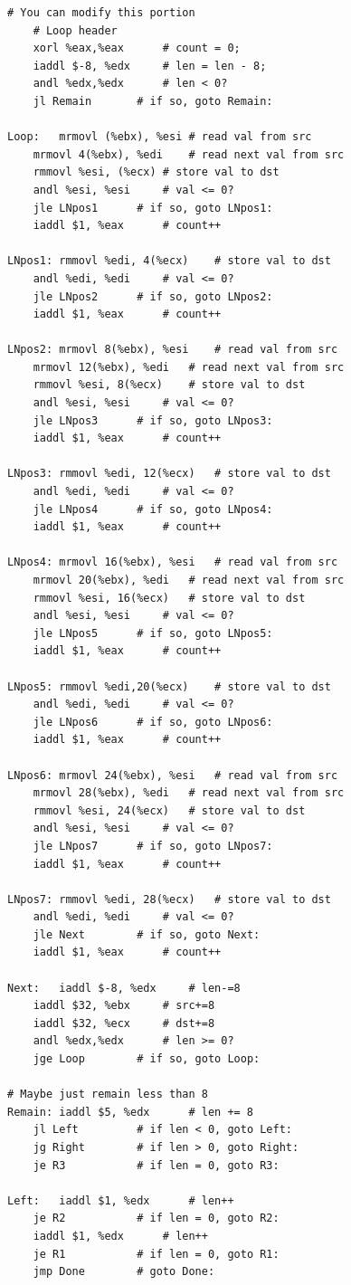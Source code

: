 \documentclass{article}
\begin{document}
\begin{lstlisting}[caption={Core Code of ncopy.ys}, label={cd:ncopy}]
# You can modify this portion
	# Loop header
	xorl %eax,%eax		# count = 0;
	iaddl $-8, %edx		# len = len - 8;
	andl %edx,%edx		# len < 0?
	jl Remain		# if so, goto Remain:

Loop:	mrmovl (%ebx), %esi	# read val from src
	mrmovl 4(%ebx), %edi	# read next val from src
	rmmovl %esi, (%ecx)	# store val to dst
	andl %esi, %esi		# val <= 0?
	jle LNpos1		# if so, goto LNpos1:
	iaddl $1, %eax		# count++

LNpos1: rmmovl %edi, 4(%ecx)	# store val to dst
	andl %edi, %edi		# val <= 0?
	jle LNpos2		# if so, goto LNpos2:
	iaddl $1, %eax		# count++

LNpos2: mrmovl 8(%ebx), %esi	# read val from src
	mrmovl 12(%ebx), %edi	# read next val from src
	rmmovl %esi, 8(%ecx)	# store val to dst
	andl %esi, %esi		# val <= 0?
	jle LNpos3		# if so, goto LNpos3:
	iaddl $1, %eax		# count++

LNpos3: rmmovl %edi, 12(%ecx)	# store val to dst
	andl %edi, %edi		# val <= 0?
	jle LNpos4		# if so, goto LNpos4:
	iaddl $1, %eax		# count++

LNpos4:	mrmovl 16(%ebx), %esi	# read val from src
	mrmovl 20(%ebx), %edi	# read next val from src
	rmmovl %esi, 16(%ecx)	# store val to dst
	andl %esi, %esi		# val <= 0?
	jle LNpos5		# if so, goto LNpos5:
	iaddl $1, %eax		# count++

LNpos5: rmmovl %edi,20(%ecx)	# store val to dst
	andl %edi, %edi		# val <= 0?
	jle LNpos6		# if so, goto LNpos6:
	iaddl $1, %eax		# count++

LNpos6: mrmovl 24(%ebx), %esi	# read val from src
	mrmovl 28(%ebx), %edi	# read next val from src
	rmmovl %esi, 24(%ecx)	# store val to dst
	andl %esi, %esi		# val <= 0?
	jle LNpos7		# if so, goto LNpos7:
	iaddl $1, %eax		# count++

LNpos7: rmmovl %edi, 28(%ecx)	# store val to dst
	andl %edi, %edi		# val <= 0?
	jle Next		# if so, goto Next:
	iaddl $1, %eax		# count++

Next:	iaddl $-8, %edx		# len-=8
	iaddl $32, %ebx		# src+=8
	iaddl $32, %ecx		# dst+=8
	andl %edx,%edx		# len >= 0? 
	jge Loop		# if so, goto Loop:

# Maybe just remain less than 8
Remain:	iaddl $5, %edx		# len += 8
	jl Left			# if len < 0, goto Left:
	jg Right		# if len > 0, goto Right:
	je R3			# if len = 0, goto R3:

Left:	iaddl $1, %edx		# len++
	je R2			# if len = 0, goto R2:
	iaddl $1, %edx		# len++
	je R1			# if len = 0, goto R1:
	jmp Done		# goto Done:


\end{lstlisting}
\end{document}
